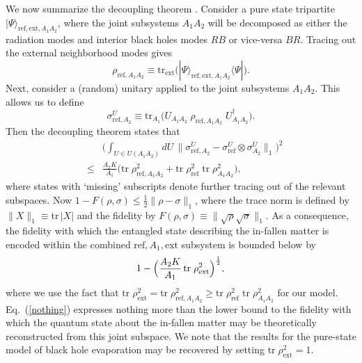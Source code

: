 \documentclass[aps,prl,amsmath,amssymb,floatfix,12pt]{revtex4}
\begin{document}
We now summarize the decoupling theorem \cite{Abey06}.
Consider a pure state tripartite
$|\Psi\rangle_{\text{ref},\text{ext},A_1A_2}$,
where the joint subsystems $A_1A_2$ will be decomposed as either
the radiation modes and interior black holes modes $RB$ or vice-versa
$BR$. Tracing out the external neighborhood modes gives
\begin{equation}
\rho_{\text{ref},A_1A_2}\equiv \text{tr}_{\text{ext}}
\bigl(|\Psi\rangle_{\text{ref},\text{ext},A_1A_2} \langle\Psi|\bigr).
\end{equation}
Next, consider a (random) unitary applied to the joint subsystems $A_1A_2$.
This allows us to define
\begin{equation}
\sigma_{\text{ref},A_2}^U\equiv 
\text{tr}_{A_1} \bigl(U_{A_1A_2}\;
\rho_{\text{ref},A_1A_2}\; U_{A_1A_2}^\dagger\bigr).
\end{equation}
Then the decoupling theorem \cite{Abey06} states that
\begin{eqnarray}
&&\biggl(\int_{U\in U(A_1A_2)}dU\,\bigl\| \sigma_{\text{ref},A_2}^U-
\sigma_{\text{ref}}^U\otimes \sigma_{A_2}^U\bigr\|_1\biggr)^2\nonumber\\
&\le& \frac{A_2 K}{A_1}\bigl(\text{tr}\; \rho_{\text{ref},A_1A_2}^2
+\text{tr}\; \rho_{\text{ref}}^2 \;\text{tr}\; \rho_{A_1A_2}^2\bigr),
\end{eqnarray}
where states with `missing' subscripts denote further tracing out of
the relevant subspaces. Now
$1-F(\rho,\sigma) \le \frac{1}{2}\|\rho-\sigma\|_1$, where the trace
norm is defined by $\|X\|_1\equiv \text{tr}\, |X|$ and the fidelity
by $F(\rho,\sigma)\equiv \|\sqrt{\rho}\sqrt{\sigma}\|_1$.
As a consequence, the fidelity with which the entangled state
describing the in-fallen matter is encoded within the combined
$\text{ref},A_1,\text{ext}$ subsystem is bounded below by \cite{me}
\begin{equation}
\!1-\Bigl(\frac{A_2 K}{A_1}\, \text{tr}\; \rho_{\text{ext}}^2
\Bigr)^{\frac{1}{2}}, \label{nothing}
\end{equation}
where we use the fact that 
$\text{tr}\; \rho_{\text{ext}}^2=
\text{tr}\; \rho_{\text{ref},A_1A_2}^2\ge
\text{tr}\; \rho_{\text{ref}}^2 \;\text{tr}\; \rho_{A_1A_2}^2$
for our model. Eq.~(\ref{nothing}) expresses nothing more than the
lower bound to the fidelity with which the quantum state about the
in-fallen matter may be theoretically reconstructed from this joint
subspace. We note that the results for the pure-state model of black
hole evaporation \cite{Hayden07} may be recovered by setting
$\text{tr}\; \rho_{\text{ext}}^2=1$.
\end{document}
